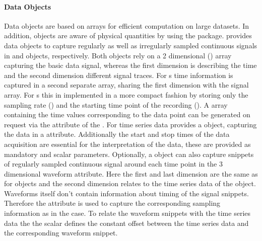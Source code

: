 \paragraph{Data Objects}
Data objects are based on  arrays \citep{van_der_walt_numpy_2011} for efficient computation on large datasets. In addition,  objects are aware of physical quantities by using the  package\citep{dale_quantities_nodate}.
 provides data objects to capture regularly as well as irregularly sampled continuous signals in  and  objects, respectively. Both objects rely on a 2 dimensional  () array capturing the basic data signal, whereas the first dimension is describing the time and the second dimension different signal traces. For s time information is captured in a second separate  array, sharing the first dimension with the signal array. For s this in implemented in a more compact fashion by storing only the sampling rate () and the starting time point of the recording (). A  array containing the time values corresponding to the data point can be generated on request via the  attribute of the .
For time series data  provides a  object, capturing the data in a  attribute. Additionally the start and stop times of the data acquisition are essential for the interpretation of the data, these are provided as mandatory  and  scalar  parameters. Optionally, a  object can also capture snippets of regularly sampled continuous signal around each time point in the 3 dimensional waveform attribute. Here the first and last dimension are the same as for  objects and the second dimension relates to the time series data of the  object. Waveforms itself don't contain information about timing of the signal snippets. Therefore the attribute  is used to capture the corresponding sampling information as in the  case. To relate the waveform snippets with the time series data the the  scalar  defines the constant offset between the time series data and the corresponding waveform snippet.

